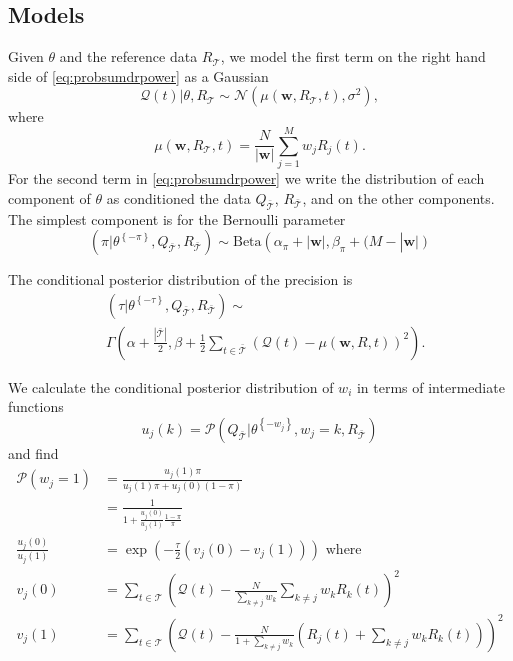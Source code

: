 \documentclass[journal]{IEEEtran}
\newcommand{\normal}[2]{{\mathcal{N}} \left(#1,#2 \right)}
\newcommand{\prob}{\mathcal{P}}
\newcommand{\eventset}{\mathcal{T}}
\newcommand{\wvector}{\mathbf w}
\newcommand{\context}{{\bar {\mathcal{T}}}}
\newcommand{\drpower}{Q}
\newcommand{\sumdrpower}{{\mathcal{Q}}}
\newcommand{\referencepower}{R}
\newcommand{\outdr}{\drpower_\context}
\newcommand{\inreference}{\referencepower_\eventset}
\newcommand{\outreference}{\referencepower_\context}
\newcommand{\thetasans}[1]{\theta^{\left\{-#1\right\}}}
\begin{document}
\subsection{Models}
\label{sec:models}

Given $\theta$ and the reference data $\inreference$, we model the
first term on the right hand side of \eqref{eq:probsumdrpower} as a
Gaussian
\begin{equation*}
  \sumdrpower(t)|\theta, \inreference \sim \normal{\mu(\wvector,
    \inreference,t)}{\sigma^2},
\end{equation*}
where
\begin{equation*}
  \mu(\wvector, \inreference,t) =
  \frac{N}{\left| \wvector \right|}\sum_{j=1}^M w_j \referencepower_j(t).
\end{equation*}
For the second term in \eqref{eq:probsumdrpower} we write the
distribution of each component of $\theta$ as conditioned the data
$\outdr$, $\outreference$, and on the other components.  The simplest
component is for the Bernoulli parameter
\begin{equation}
  \label{eq:bernoulli}
  \left( \pi | \thetasans{\pi}, \outdr, \outreference \right) \sim
  \text{Beta} \left( \alpha_\pi + \left| \wvector \right|, \beta_\pi +
    (M - \right| \wvector \left| \right)
\end{equation}

The conditional posterior  distribution of the precision is
\begin{align}
  &(\tau | \thetasans{\tau}, \outdr, \outreference)  \sim \nonumber \\
  \label{cond:distributionTau}
  &\Gamma \left(
    \alpha+\frac{\left| \context \right| }{2},
    \beta + \frac{1}{2}\sum_{t\in \context} \left( \sumdrpower(t) -
      \mu(\wvector, \referencepower, t) \right)^2 \right).
\end{align}

We calculate the conditional posterior  distribution of $w_i$ in terms
of intermediate functions
\begin{equation*}
  u_j(k) = \prob(\outdr|\thetasans{w_j}, w_j=k, \outreference)
\end{equation*}
and find
\begin{align*}
  \prob(w_j=1)
  &= \frac{u_j(1) \pi}{u_j(1)\pi + u_j(0)(1-\pi)} \\
  &= \frac{1}{1+ \frac{u_j(0)}{u_j(1)}\frac{1-\pi}{\pi}} \\
  \frac{u_j(0)}{u_j(1)}
  &= \exp \left( -\frac{\tau}{2} \left( v_j(0) - v_j(1) \right)
    \right) \text{ where} \\
  v_j(0) &= \sum_{t\in\eventset} \left(
           \sumdrpower(t) - \frac{N}{\sum_{k\neq j}w_k} \sum_{k\neq j}
           w_k \referencepower_k(t) \right)^2 \\
  v_j(1) &= \sum_{t\in\eventset} \left(
           \sumdrpower(t) - \frac{N}{1+\sum_{k\neq j}w_k} \left(
           \referencepower_j(t) + \sum_{k\neq j}
           w_k \referencepower_k(t) \right) \right)^2
\end{align*}
\end{document}
